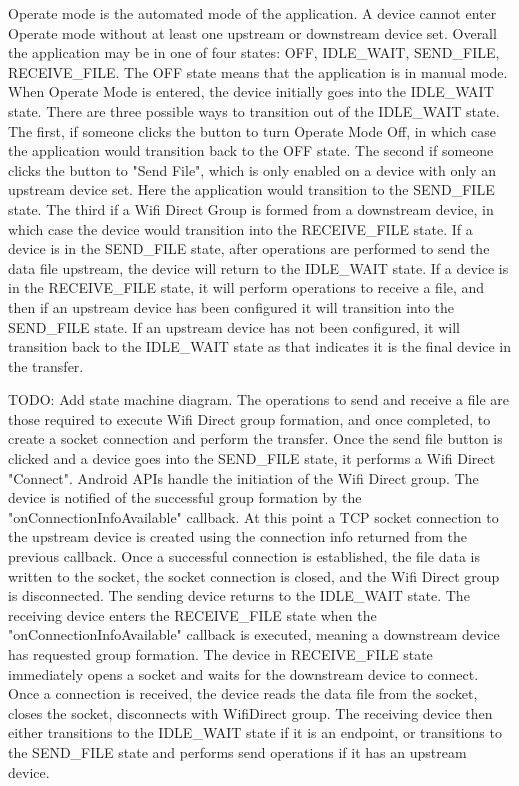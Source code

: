 \documentclass[10pt,twocolumn]{article}
\begin{document}
Operate mode is the automated mode of the application.
A device cannot enter Operate mode without at least one upstream or downstream device set.
Overall the application may be in one of four states: OFF, IDLE\_WAIT, SEND\_FILE, RECEIVE\_FILE.
The OFF state means that the application is in manual mode.
When Operate Mode is entered, the device initially goes into the IDLE\_WAIT state.
There are three possible ways to transition out of the IDLE\_WAIT state.
The first, if someone clicks the button to turn Operate Mode Off, in which case the application would transition back to the OFF state.
The second if someone clicks the button to "Send File", which is only enabled on a device with only an upstream device set.
Here the application would transition to the SEND\_FILE state.
The third if a Wifi Direct Group is formed from a downstream device, in which case the device would transition into the RECEIVE\_FILE state.
If a device is in the SEND\_FILE state, after operations are performed to send the data file upstream, the device will return to the IDLE\_WAIT state.
If a device is in the RECEIVE\_FILE state, it will perform operations to receive a file, and then if an upstream device has been configured it will transition into the SEND\_FILE state.
If an upstream device has not been configured, it will transition back to the IDLE\_WAIT state as that indicates it is the final device in the transfer.

TODO: Add state machine diagram.  
The operations to send and receive a file are those required to execute Wifi Direct group formation, and once completed, to create a socket connection and perform the transfer. 
Once the send file button is clicked and a device goes into the SEND\_FILE state, it performs a Wifi Direct "Connect". 
Android APIs handle the initiation of the Wifi Direct group.
The device is notified of the successful group formation by the "onConnectionInfoAvailable" callback.
At this point a TCP socket connection to the upstream device is created using the connection info returned from the previous callback.
Once a successful connection is established, the file data is written to the socket, the socket connection is closed, and the Wifi Direct group is disconnected.
The sending device returns to the IDLE\_WAIT state.
The receiving device enters the RECEIVE\_FILE state when the "onConnectionInfoAvailable" callback is executed, meaning a downstream device has requested group formation.
The device in RECEIVE\_FILE state immediately opens a socket and waits for the downstream device to connect.
Once a connection is received, the device reads the data file from the socket, closes the socket, disconnects with WifiDirect group.
The receiving device then either transitions to the IDLE\_WAIT state if it is an endpoint, or transitions to the SEND\_FILE state and performs send operations if it has an upstream device.
\end{document}
